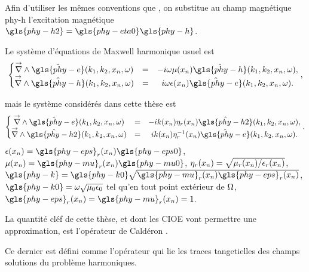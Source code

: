 Afin d'utiliser les mêmes conventions que \cite{stupfel_implementation_2015}, on substitue au champ magnétique \gls{phy-h} l’excitation magnétique \(\gls{phy-h2} = \gls{phy-eta0} \gls{phy-h}\).

Le système d'équations de Maxwell harmonique usuel est
\begin{equation}
    \left\lbrace
    \begin{matrix}
    \vrot \hat{\gls{phy-e}}(k_1,k_2,x_n,\w)  &=& -i \omega \mu(x_n) \hat{\gls{phy-h}}(k_1,k_2,x_n,\w),
    \\
    \vrot \hat{\gls{phy-h}}(k_1,k_2,x_n,\w)  &=& i \omega \eps(x_n) \hat{\gls{phy-e}}(k_1,k_2,x_n,\w).
    \end{matrix}
    \right.,
    \label{eq:imp_fourier:intro:maxwell_harmonique}
\end{equation}

mais le système considérés dans cette thèse est
\begin{equation}
    \left\lbrace
    \begin{matrix}
    \vrot \hat{\gls{phy-e}}(k_1,k_2,x_n,\w)  &=& -i k(x_n) \eta_r(x_n) \hat{\gls{phy-h2}}(k_1,k_2,x_n,\w),  \\
    \vrot \hat{\gls{phy-h2}}(k_1,k_2,x_n,\w)  &=& i k(x_n) \eta_r^{-1}(x_n) \hat{\gls{phy-e}}(k_1,k_2,x_n,\w).
    \end{matrix}
    \right..
    \label{eq:imp_fourier:intro:maxwell_harmonique:form_cea}
\end{equation}
\(\eps(x_n)=\gls{phy-eps}_r(x_n)\gls{phy-eps0}\), \(\mu(x_n)=\gls{phy-mu}_r(x_n)\gls{phy-mu0}\), \(\eta_r(x_n)=\sqrt{\mu_r(x_n)/\epsilon_r(x_n)}\), \(\gls{phy-k}=\gls{phy-k0}\sqrt{\gls{phy-mu}_r(x_n)\gls{phy-eps}_r(x_n)}\), \(\gls{phy-k0} = \w\sqrt{\mu_0\eps_0}\) tel qu'en tout point extérieur de \(\Omega\), \(\gls{phy-eps}_r(x_n) = \gls{phy-mu}_r(x_n)= 1\).

\hypertarget{calderon}{}
\begin{defn}{}
    \label{def:calderon}
    La quantité cléf de cette thèse, et dont les CIOE vont permettre une approximation, est l'opérateur de Caldéron \cite[Def~4, p.~108]{cessenat_mathematical_1996}.

    Ce dernier est défini comme l'opérateur qui lie les traces tangetielles des champs solutions du problème harmoniques.
\end{defn}


